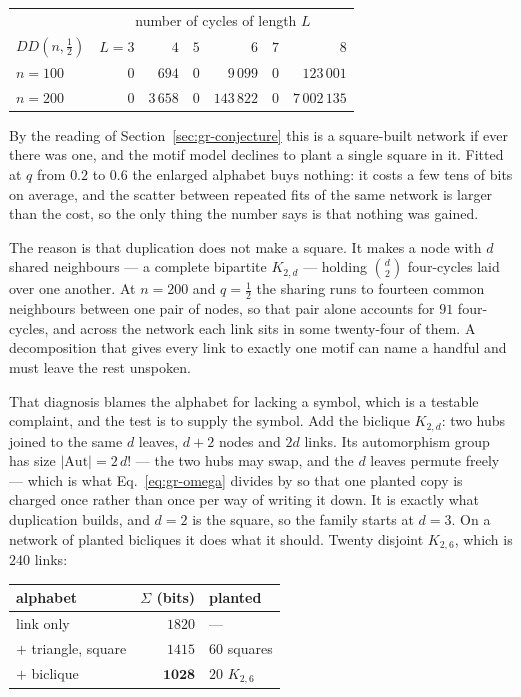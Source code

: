 \begin{center}
\begin{tabular}{lrrrrrr}
\hline
 & \multicolumn{6}{c}{number of cycles of length $L$}\\
$DD(n,\tfrac12)$ & $L=3$ & $4$ & $5$ & $6$ & $7$ & $8$ \\
\hline
$n=100$ & $0$ & $694$ & $0$ & $9\,099$ & $0$ & $123\,001$\\
$n=200$ & $0$ & $3\,658$ & $0$ & $143\,822$ & $0$ & $7\,002\,135$\\
\hline
\end{tabular}
\end{center}

\noindent By the reading of Section~\ref{sec:gr-conjecture} this is a square-built
network if ever there was one, and the motif model declines to plant a single
square in it. Fitted at $q$ from $0.2$ to $0.6$ the enlarged alphabet buys
nothing: it costs a few tens of bits on average, and the scatter between repeated
fits of the same network is larger than the cost, so the only thing the number
says is that nothing was gained.

The reason is that duplication does not make a square. It makes a node with $d$
shared neighbours --- a complete bipartite $K_{2,d}$ --- holding $\binom{d}{2}$
four-cycles laid over one another. At $n=200$ and $q=\tfrac12$ the sharing runs
to fourteen common neighbours between one pair of nodes, so that pair alone
accounts for $91$ four-cycles, and across the network each link sits in some
twenty-four of them. A decomposition that gives every link to exactly one motif
can name a handful and must leave the rest unspoken.

That diagnosis blames the alphabet for lacking a symbol, which is a testable
complaint, and the test is to supply the symbol. Add the biclique $K_{2,d}$: two
hubs joined to the same $d$ leaves, $d+2$ nodes and $2d$ links. Its automorphism
group has size $|\mathrm{Aut}|=2\,d!$ --- the two hubs may swap, and the $d$
leaves permute freely --- which is what Eq.~\eqref{eq:gr-omega} divides by so
that one planted copy is charged once rather than once per way of writing it
down. It is exactly what duplication builds, and $d=2$ is the square, so the
family starts at $d=3$. On a network of planted bicliques it does what it should.
Twenty disjoint $K_{2,6}$, which is $240$ links:

\begin{center}
\begin{tabular}{lrl}
\hline
alphabet & $\Sigma$ (bits) & planted\\
\hline
link only            & $1820$ & ---\\
$+$ triangle, square & $1415$ & $60$ squares\\
$+$ biclique         & $\mathbf{1028}$ & $20$ $K_{2,6}$\\
\hline
\end{tabular}
\end{center}

